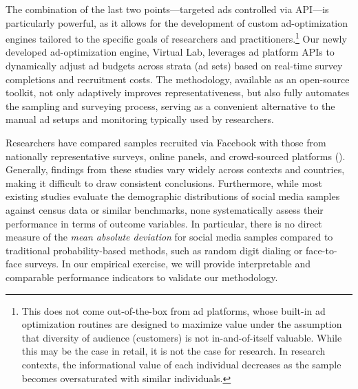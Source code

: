 \documentclass[letterpaper,12pt]{article}
\theoremstyle{proposition}
\begin{document}
The combination of the last two points---targeted ads controlled via API---is particularly powerful, as it allows for the development of custom ad-optimization engines tailored to the specific goals of researchers and practitioners.\footnote{This does not come out-of-the-box from ad platforms, whose built-in ad optimization routines are designed to maximize value under the assumption that diversity of audience (customers) is not in-and-of-itself valuable. While this may be the case in retail, it is not the case for research. In research contexts, the informational value of each individual decreases as the sample becomes oversaturated with similar individuals.} 
Our newly developed ad-optimization engine, Virtual Lab, leverages ad platform APIs to dynamically adjust ad budgets across strata (ad sets) based on real-time survey completions and recruitment costs. The methodology, available as an open-source toolkit, not only adaptively improves representativeness, but also fully automates the sampling and surveying process, serving as a convenient alternative to the manual ad setups and monitoring typically used by researchers.

Researchers have compared samples recruited via Facebook with those from nationally representative surveys, online panels, and crowd-sourced platforms (\citealt{samuels2013using,rosenzweig2020survey,beam2023social,neundorf2023improve}). Generally, findings from these studies vary widely across contexts and countries, making it difficult to draw consistent conclusions. Furthermore, while most existing studies evaluate the demographic distributions of social media samples against census data or similar benchmarks, none systematically assess their performance in terms of outcome variables. In particular, there is no direct measure of the \textit{mean absolute deviation} for social media samples compared to traditional probability-based methods, such as random digit dialing or face-to-face surveys. In our empirical exercise, we will provide interpretable and comparable performance indicators to validate our methodology.

\end{document}
